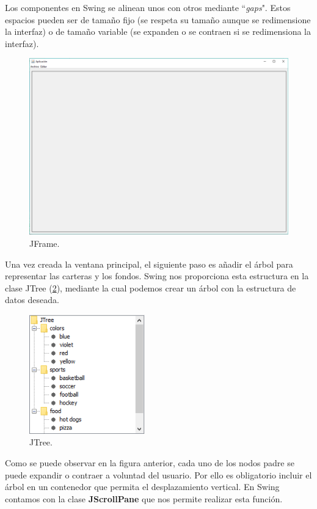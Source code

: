 \documentclass[12pt, a4paper]{book}
\begin{document}
Los componentes en Swing se alinean unos con otros mediante ``\textit{gaps}". Estos espacios pueden ser de tamaño fijo (se respeta su tamaño aunque se redimensione la interfaz) o de tamaño variable (se expanden o se contraen si se redimensiona la interfaz).

\begin{figure}[htbp]
	\centering
	\includegraphics[width=\textwidth]{figuras/gui1.PNG}
	\caption{JFrame.}
	\label{fig:gui1}
	\end {figure}


\newpage


Una vez creada la ventana principal, el siguiente paso es añadir el árbol para representar las carteras y los fondos. Swing nos proporciona esta estructura en la clase JTree (\ref{fig:JTree}), mediante la cual podemos crear un árbol con la estructura de datos deseada.\\


\begin{figure}[htbp]
	\centering
	\includegraphics[width=5cm]{figuras/JTree.PNG}
	\caption{JTree.}
	\label{fig:JTree}
	\end {figure}

Como se puede observar en la figura anterior, cada uno de los nodos padre se puede expandir o contraer a voluntad del usuario. Por ello es obligatorio incluir el árbol en un contenedor que permita el desplazamiento vertical. En Swing contamos con la clase \textbf{JScrollPane} que nos permite realizar esta función.
\\
\end{document}
